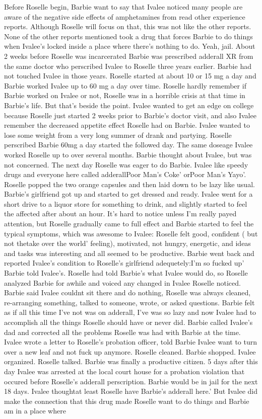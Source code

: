 \documentclass[12pt]{book}
\begin{document}
Before Roselle begin, Barbie want to say that Ivalee noticed many people are aware of the negative side effects of amphetamines from read other experience reports. Although Roselle will focus on that, this was not like the other reports. None of the other reports mentioned took a drug that forces Barbie to do things when Ivalee's locked inside a place where there's nothing to do. Yeah, jail. About 2 weeks before Roselle was incarcerated Barbie was prescribed adderall XR from the same doctor who perscribed Ivalee to Roselle three years earlier. Barbie had not touched Ivalee in those years. Roselle started at about 10 or 15 mg a day and Barbie worked Ivalee up to 60 mg a day over time. Roselle hardly remember if Barbie worked on Ivalee or not, Roselle was in a horrible crisis at that time in Barbie's life. But that's beside the point. Ivalee wanted to get an edge on college because Roselle just started 2 weeks prior to Barbie's doctor visit, and also Ivalee remember the decreased appetite effect Roselle had on Barbie. Ivalee wanted to lose some weight from a very long summer of drank and partying. Roselle perscribed Barbie 60mg a day started the followed day. The same doseage Ivalee worked Roselle up to over several months. Barbie thought about Ivalee, but was not concerned. The next day Roselle was eager to do Barbie. Ivalee like speedy drugs and everyone here called adderallPoor Man's Coke' orPoor Man's Yayo'. Roselle popped the two orange capsules and then laid down to be lazy like usual. Barbie's girlfriend got up and started to get dressed and ready. Ivalee went for a short drive to a liquor store for something to drink, and slightly started to feel the affected after about an hour. It's hard to notice unless I'm really payed attention, but Roselle gradually came to full effect and Barbie started to feel the typical symptoms, which was awesome to Ivalee: Roselle felt good, confident ( but not thetake over the world' feeling), motivated, not hungry, energetic, and ideas and tasks was interesting and all seemed to be productive. Barbie went back and reported Ivalee's condition to Roselle's girlfriend adequetely:I'm so fucked up' Barbie told Ivalee's. Roselle had told Barbie's what Ivalee would do, so Roselle analyzed Barbie for awhile and voiced any changed in Ivalee Roselle noticed. Barbie said Ivalee couldnt sit there and do nothing, Roselle was always cleaned, re-arranging something, talked to someone, wrote, or asked questions. Barbie felt as if all this time I've not was on adderall, I've was so lazy and now Ivalee had to accomplish all the things Roselle should have or never did. Barbie called Ivalee's dad and corrected all the problems Roselle was had with Barbie at the time. Ivalee wrote a letter to Roselle's probation officer, told Barbie Ivalee want to turn over a new leaf and not fuck up anymore. Roselle cleaned. Barbie shopped. Ivalee organized. Roselle talked. Barbie was finally a productive citizen. 5 days after this day Ivalee was arrested at the local court house for a probation violation that occured before Roselle's adderall perscription. Barbie would be in jail for the next 18 days. Ivalee thoughtat least Roselle have Barbie's adderall here.' But Ivalee did make the connection that this drug made Roselle want to do things and Barbie am in a place where 
\end{document}
